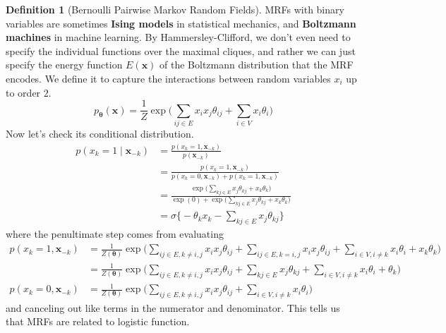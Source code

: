 \documentclass{article}
\theoremstyle{definition}
\theoremstyle{remark}
\theoremstyle{definition}
\newtheorem{definition}{Definition}[section]
\begin{document}
    \begin{definition}[Bernoulli Pairwise Markov Random Fields]
      MRFs with binary variables are sometimes \textbf{Ising models} in statistical mechanics, and \textbf{Boltzmann machines} in machine learning. By Hammersley-Clifford, we don't even need to specify the individual functions over the maximal cliques, and rather we can just specify the energy function $E(\mathbf{x})$ of the Boltzmann distribution that the MRF encodes. We define it to capture the interactions between random variables $x_i$ up to order $2$. 
        \[p_{\boldsymbol{\theta}} (\mathbf{x}) = \frac{1}{Z} \exp \bigg( \sum_{ij \in E} x_i x_j \theta_{ij} + \sum_{i \in V} x_i \theta_i \bigg) \]
      Now let's check its conditional distribution. 
        \begin{align*}
          p(x_k = 1 \mid \mathbf{x}_{-k}) & = \frac{p(x_k = 1, \mathbf{x}_{-k})}{p(\mathbf{x}_{-k})} \\
                                          & = \frac{p(x_k = 1, \mathbf{x}_{-k})}{p(x_k = 0, \mathbf{x}_{-k}) + p(x_k = 1, \mathbf{x}_{-k})} \\
                                          & = \frac{\exp \Big( \sum_{k j \in E} x_j \theta_{kj} + x_k \theta_k \Big)}{\exp(0) + \exp \Big(\sum_{k j \in E} x_j \theta_{kj} + x_k \theta_k \Big)} \\
                                          & = \sigma \bigg\{ - \theta_k x_k - \sum_{k j \in E} x_j \theta_{k j} \bigg\} 
        \end{align*}
      where the penultimate step comes from evaluating 
        \begin{align*} 
          p(x_k = 1, \mathbf{x}_{-k}) & = \frac{1}{Z(\boldsymbol{\theta})} \exp \bigg( \sum_{ij \in E, k \neq i, j} x_i x_j \theta_{ij} + \sum_{i j \in E, k = i, j} x_i x_j \theta_{ij} + \sum_{i \in V, i \neq k} x_i \theta_i + x_k \theta_k \bigg) \\
                                      & =\frac{1}{Z(\boldsymbol{\theta})} \exp \bigg( \sum_{ij \in E, k \neq i, j} x_i x_j \theta_{ij} + \sum_{k j \in E} x_j \theta_{kj} + \sum_{i \in V, i \neq k} x_i \theta_i + \theta_k \bigg)  \\ 
          p(x_k = 0, \mathbf{x}_{-k}) & = \frac{1}{Z(\boldsymbol{\theta})} \exp \bigg( \sum_{ij \in E, k \neq i, j} x_i x_j \theta_{ij} + \sum_{i \in V, i \neq k} x_i \theta_i\bigg)  
        \end{align*}
      and canceling out like terms in the numerator and denominator. This tells us that MRFs are related to logistic function.  
    \end{definition}
\end{document}
